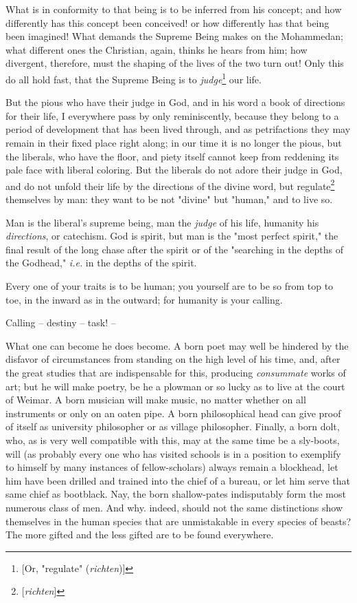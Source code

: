 What is in conformity to that being is to be inferred from his concept; and 
how differently has this concept been conceived! or how differently has that 
being been imagined! What demands the Supreme Being makes on the Mohammedan; 
what different ones the Christian, again, thinks he hears from him; how 
divergent, therefore, must the shaping of the lives of the two turn out! Only 
this do all hold fast, that the Supreme Being is to 
\textit{judge}\footnote{[Or, "{}regulate"{} (\textit{richten})]} our life.

But the pious who have their judge in God, and in his word a book of 
directions for their life, I everywhere pass by only reminiscently, because 
they belong to a period of development that has been lived through, and as 
petrifactions they may remain in their fixed place right along; in our time it 
is no longer the pious, but the liberals, who have the floor, and piety itself 
cannot keep from reddening its pale face with liberal coloring. But the 
liberals do not adore their judge in God, and do not unfold their life by the 
directions of the divine word, but regulate\footnote{[\textit{richten}]} 
themselves by man: they want to be not "{}divine"{} but "{}human,"{} and to 
live so.

Man is the liberal's supreme being, man the \textit{judge} of his life, 
humanity his \textit{directions}, or catechism. God is spirit, but man is the 
"{}most perfect spirit,"{} the final result of the long chase after the spirit 
or of the "{}searching in the depths of the Godhead,"{} \textit{i.e.} in the 
depths of the spirit.

Every one of your traits is to be human; you yourself are to be so from top to 
toe, in the inward as in the outward; for humanity is your calling.

Calling -- destiny -- task! --

What one can become he does become. A born poet may well be hindered by the 
disfavor of circumstances from standing on the high level of his time, and, 
after the great studies that are indispensable for this, producing 
\textit{consummate} works of art; but he will make poetry, be he a plowman or 
so lucky as to live at the court of Weimar. A born musician will make music, 
no matter whether on all instruments or only on an oaten pipe. A born 
philosophical head can give proof of itself as university philosopher or as 
village philosopher. Finally, a born dolt, who, as is very well compatible 
with this, may at the same time be a sly-boots, will (as probably every one 
who has visited schools is in a position to exemplify to himself by many 
instances of fellow-scholars) always remain a blockhead, let him have been 
drilled and trained into the chief of a bureau, or let him serve that same 
chief as bootblack. Nay, the born shallow-pates indisputably form the most 
numerous class of men. And why. indeed, should not the same distinctions show 
themselves in the human species that are unmistakable in every species of 
beasts? The more gifted and the less gifted are to be found everywhere.

